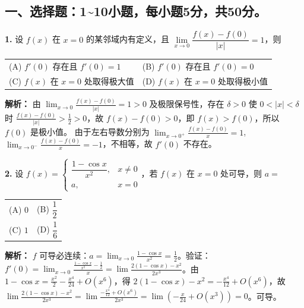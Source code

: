 \subsection*{一、选择题：1\textasciitilde10小题，每小题5分，共50分。}

\textbf{1.} 设 $f(x)$ 在 $x=0$ 的某邻域内有定义，且 $\lim\limits_{x\to0}\dfrac{f(x)-f(0)}{|x|}=1$，则
\begin{center}
\begin{tabular}{ll}
(A) $f'(0)$ 存在且 $f'(0)=1$ & (B) $f'(0)$ 存在且 $f'(0)=0$ \\[4pt]
(C) $f(x)$ 在 $x=0$ 处取得极大值 & (D) $f(x)$ 在 $x=0$ 处取得极小值
\end{tabular}
\end{center}

\ifshowsolutions\par\noindent\textbf{解析：} 由 $\lim_{x\to0}\frac{f(x)-f(0)}{|x|}=1>0$ 及极限保号性，存在 $\delta>0$ 使 $0<|x|<\delta$ 时 $\frac{f(x)-f(0)}{|x|}>\frac{1}{2}>0$，故 $f(x)-f(0)>0$，即 $f(x)>f(0)$，所以 $f(0)$ 是极小值。
由于左右导数分别为 $\lim_{x\to0^+}\frac{f(x)-f(0)}{x}=1$, $\lim_{x\to0^-}\frac{f(x)-f(0)}{x}=-1$，不相等，故 $f'(0)$ 不存在。\else \answerarea \fi

\vspace{8pt}

\textbf{2.} 设 $f(x)=\begin{cases}\dfrac{1-\cos x}{x^2},&x\neq0\\a,&x=0\end{cases}$，若 $f(x)$ 在 $x=0$ 处可导，则 $a=$
\begin{center}
\begin{tabular}{ll}
(A) $0$ & (B) $\dfrac{1}{2}$ \\[6pt]
(C) $1$ & (D) $\dfrac{1}{6}$
\end{tabular}
\end{center}

\ifshowsolutions\par\noindent\textbf{解析：} $f$ 可导必连续：$a=\lim_{x\to0}\frac{1-\cos x}{x^2}=\frac{1}{2}$。验证：$f'(0)=\lim_{x\to0}\frac{\frac{1-\cos x}{x^2}-\frac12}{x}=\lim\frac{2(1-\cos x)-x^2}{2x^3}$。由 $1-\cos x=\frac{x^2}{2}-\frac{x^4}{24}+O(x^6)$，得 $2(1-\cos x)-x^2=-\frac{x^4}{12}+O(x^6)$，故 $\lim\frac{2(1-\cos x)-x^2}{2x^3}=\lim\frac{-\frac{x^4}{12}+O(x^6)}{2x^3}=\lim\left(-\frac{x}{24}+O(x^3)\right)=0$。可导。
\else \answerarea \fi

\vspace{8pt}

